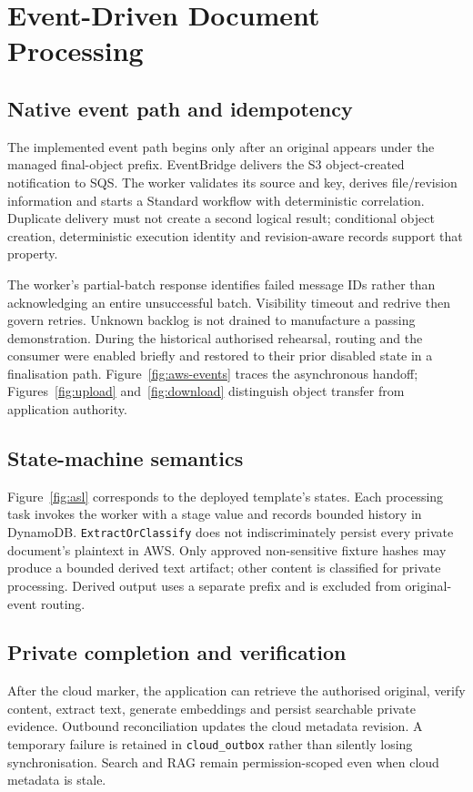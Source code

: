 \chapter{Event-Driven Document Processing}
\section{Native event path and idempotency}
The implemented event path begins only after an original appears under the managed final-object prefix. EventBridge delivers the S3 object-created notification to SQS. The worker validates its source and key, derives file/revision information and starts a Standard workflow with deterministic correlation. Duplicate delivery must not create a second logical result; conditional object creation, deterministic execution identity and revision-aware records support that property.

The worker's partial-batch response identifies failed message IDs rather than acknowledging an entire unsuccessful batch. Visibility timeout and redrive then govern retries. Unknown backlog is not drained to manufacture a passing demonstration. During the historical authorised rehearsal, routing and the consumer were enabled briefly and restored to their prior disabled state in a finalisation path.
Figure~\ref{fig:aws-events} traces the asynchronous handoff; Figures~\ref{fig:upload} and~\ref{fig:download} distinguish object transfer from application authority.
\section{State-machine semantics}
Figure~\ref{fig:asl} corresponds to the deployed template's states. Each processing task invokes the worker with a stage value and records bounded history in DynamoDB. \texttt{ExtractOrClassify} does not indiscriminately persist every private document's plaintext in AWS. Only approved non-sensitive fixture hashes may produce a bounded derived text artifact; other content is classified for private processing. Derived output uses a separate prefix and is excluded from original-event routing.
\section{Private completion and verification}
After the cloud marker, the application can retrieve the authorised original, verify content, extract text, generate embeddings and persist searchable private evidence. Outbound reconciliation updates the cloud metadata revision. A temporary failure is retained in \texttt{cloud\_outbox} rather than silently losing synchronisation. Search and RAG remain permission-scoped even when cloud metadata is stale.

